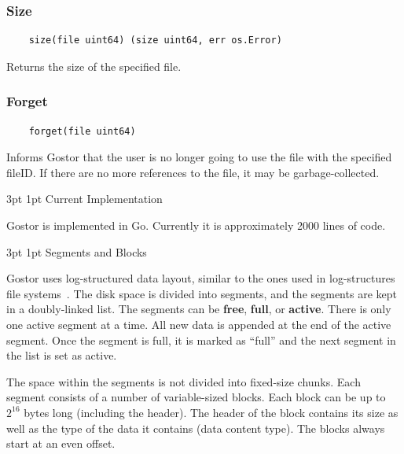 \documentclass[11pt]{p9article}
\makeatletter
\renewcommand\section{\@startsection {section}{1}{\z@} {3pt} {1pt} {\normalfont\normalsize\bfseries}}
\renewcommand\subsection{\@startsection {subsection}{1}{\z@} {3pt} {1pt} {\normalfont\normalsize\bfseries}}
\makeatother
\begin{document}
\subsubsection{Size}
 
\begin{verbatim}
    size(file uint64) (size uint64, err os.Error)
\end{verbatim}

Returns the size of the specified file.

\subsubsection{Forget}

\begin{verbatim}
    forget(file uint64)
\end{verbatim}

Informs Gostor that the user is no longer going to use the file with
the specified fileID. If there are no more references to the file, it
may be garbage-collected.

\section{Current Implementation}

Gostor is implemented in Go. Currently it is approximately 2000 lines
of code.

\subsection{Segments and Blocks}

Gostor uses log-structured data layout, similar to the ones used in
log-structures file systems~\cite{Rosenblum:1991:DIL:121133.121137}.
The disk space is divided into segments, and the segments are kept in
a doubly-linked list. The segments can be {\bfseries free}, {\bfseries
full}, or {\bfseries active}. There is only one active segment at a
time. All new data is appended at the end of the active segment. Once
the segment is full, it is marked as ``full'' and the next segment in
the list is set as active.

The space within the segments is not divided into fixed-size chunks.
Each segment consists of a number of variable-sized blocks. Each block
can be up to $2^{16}$ bytes long (including the header). The header of
the block contains its size as well as the type of the data it
contains (data content type). The blocks always start at an even
offset.
\end{document}
